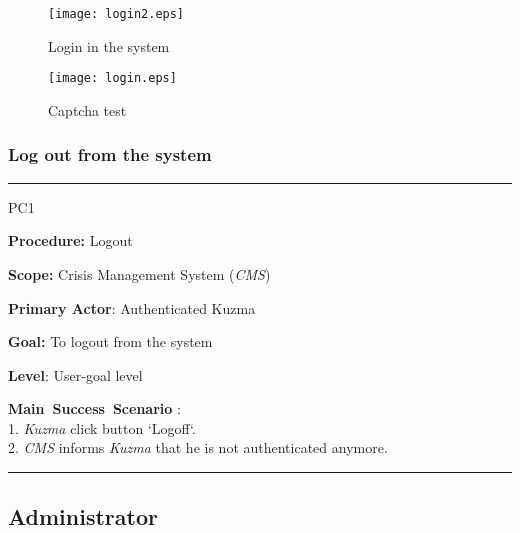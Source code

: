 \begin{figure}[h]
    \texttt{[image: login2.eps]}
	\caption{Login in the system}
\end{figure}

\begin{figure}[h]
    \texttt{[image: login.eps]}
	\caption{Captcha test}
\end{figure}

\subsubsection{Log out from the system}
\vspace{0.5cm}
\hrule
\begin{lyxlist}{PC1}
\small{
\item [\textbf{Procedure:}] Logout
\item [\textbf{Scope:}] Crisis Management System (\emph{CMS})
\item [\textbf{Primary Actor}:] Authenticated Kuzma
\item [\textbf{Goal:}] To logout from the system
\item [\textbf{Level}:] User-goal level
\item [\textbf{Main~Success~Scenario}]:\\
1. \emph{Kuzma} click button `Logoff`.\\
2. \emph{CMS} informs \emph{Kuzma} that he is not authenticated anymore.\\
}
\end{lyxlist}
\hrule
\vspace{0.5cm}



\subsection{Administrator}

